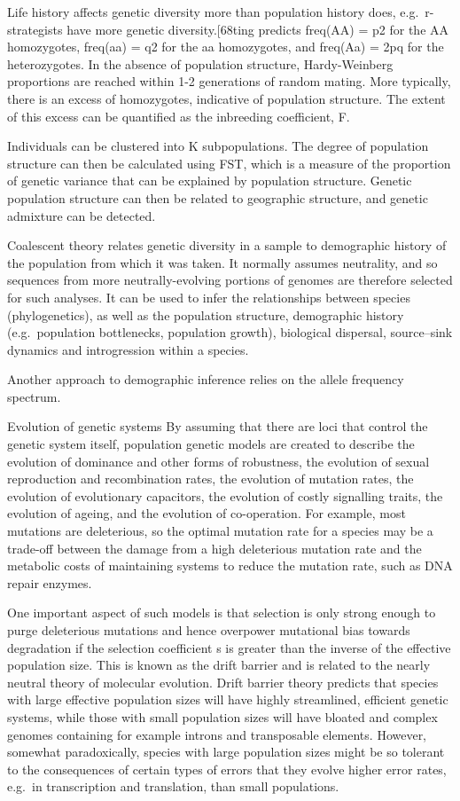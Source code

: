 Life history affects genetic diversity more than population history does, e.g.~r-strategists have more genetic diversity.{[}68ting predicts freq(AA) = p2 for the AA homozygotes, freq(aa) = q2 for the aa homozygotes, and freq(Aa) = 2pq for the heterozygotes. In the absence of population structure, Hardy-Weinberg proportions are reached within 1-2 generations of random mating. More typically, there is an excess of homozygotes, indicative of population structure. The extent of this excess can be quantified as the inbreeding coefficient, F.

Individuals can be clustered into K subpopulations. The degree of population structure can then be calculated using FST, which is a measure of the proportion of genetic variance that can be explained by population structure. Genetic population structure can then be related to geographic structure, and genetic admixture can be detected.

Coalescent theory relates genetic diversity in a sample to demographic history of the population from which it was taken. It normally assumes neutrality, and so sequences from more neutrally-evolving portions of genomes are therefore selected for such analyses. It can be used to infer the relationships between species (phylogenetics), as well as the population structure, demographic history (e.g.~population bottlenecks, population growth), biological dispersal, source--sink dynamics and introgression within a species.

Another approach to demographic inference relies on the allele frequency spectrum.

Evolution of genetic systems
By assuming that there are loci that control the genetic system itself, population genetic models are created to describe the evolution of dominance and other forms of robustness, the evolution of sexual reproduction and recombination rates, the evolution of mutation rates, the evolution of evolutionary capacitors, the evolution of costly signalling traits, the evolution of ageing, and the evolution of co-operation. For example, most mutations are deleterious, so the optimal mutation rate for a species may be a trade-off between the damage from a high deleterious mutation rate and the metabolic costs of maintaining systems to reduce the mutation rate, such as DNA repair enzymes.

One important aspect of such models is that selection is only strong enough to purge deleterious mutations and hence overpower mutational bias towards degradation if the selection coefficient s is greater than the inverse of the effective population size. This is known as the drift barrier and is related to the nearly neutral theory of molecular evolution. Drift barrier theory predicts that species with large effective population sizes will have highly streamlined, efficient genetic systems, while those with small population sizes will have bloated and complex genomes containing for example introns and transposable elements. However, somewhat paradoxically, species with large population sizes might be so tolerant to the consequences of certain types of errors that they evolve higher error rates, e.g.~in transcription and translation, than small populations.

